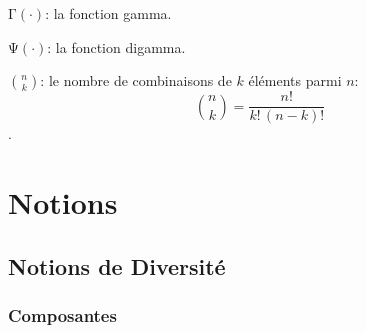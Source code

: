 \documentclass[
  11pt,
  american,
  a4paper,
  extrafontsizes,onecolumn,openright
  ]{memoir}
\begin{document}
\noindent \(\mathrm{\Gamma}(\cdot)\): la fonction gamma.

\noindent \(\mathrm{\Psi}(\cdot)\): la fonction digamma.

\noindent \(\binom{n}{k}\): le nombre de combinaisons de \(k\) éléments parmi \(n\): \[\binom{n}{k}=\frac{n!}{k!\,(n-k)!}\].

\mainmatter

\part{Notions}\label{part-notions}

\chapter{Notions de Diversité}\label{chap-Notions}

\section{Composantes}\label{composantes}



\scriptsize
\end{document}
